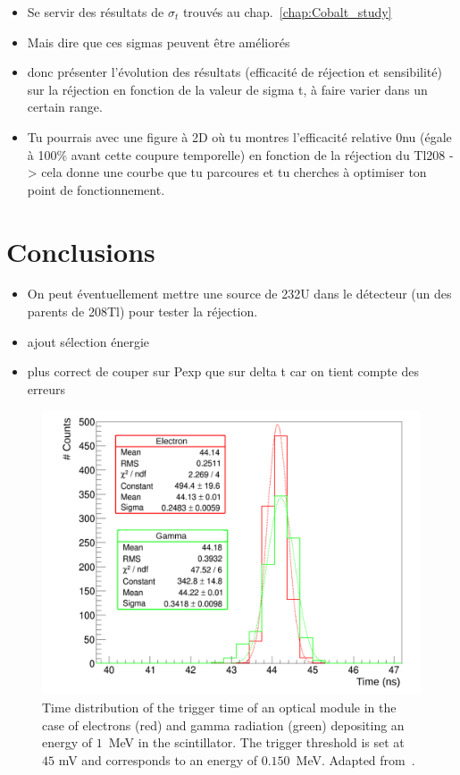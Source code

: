 \begin{itemize}
\item Se servir des résultats de $\sigma_{t}$ trouvés au chap.~\ref{chap:Cobalt_study}
\item Mais dire que ces sigmas peuvent être améliorés
\item donc présenter l'évolution des résultats (efficacité de réjection et sensibilité) sur la réjection en fonction de la valeur de sigma t, à faire varier dans un certain range.
\item Tu pourrais avec une figure à 2D où tu montres l'efficacité relative 0nu (égale à 100\% avant cette coupure temporelle) en fonction de la réjection du Tl208 -> cela donne une courbe que tu parcoures et tu cherches à optimiser ton point de fonctionnement.
\end{itemize}


\section{Conclusions}

\begin{itemize}
\item On peut éventuellement mettre une source de 232U dans le détecteur (un des parents de 208Tl) pour tester la réjection.
\item ajout sélection énergie
\item plus correct de couper sur Pexp que sur delta t car on tient compte des erreurs
\end{itemize}


\begin{figure}
  \centering
  \includegraphics[width=13cm]{timedifference/fig_timediff/Arnaud_RMS_PM.pdf}
  \caption{Time distribution of the trigger time of an optical module in the case of electrons (red) and gamma radiation (green) depositing an energy of $1$~MeV in the scintillator.
    The trigger threshold is set at $45$ mV and corresponds to an energy of $0.150$~MeV.
    Adapted from~\cite{HuberThesis}.
  \label{fig:Arnaud_RMS_PM}}
\end{figure}
